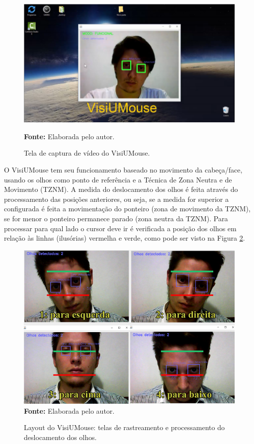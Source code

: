\begin{figure}[htbp]
\centering
\caption{Tela de captura de vídeo do VisiUMouse.}

\includegraphics[scale=.6]{img/visiumouse-1.png}

  \textbf{Fonte:} Elaborada pelo autor.
\label{fig:visiumouse-1}
\end{figure}

O VisiUMouse tem seu funcionamento baseado no movimento da cabeça/face, usando os olhos como ponto de referência e a Técnica de Zona Neutra e de Movimento (TZNM). A medida do deslocamento dos olhos é feita através do processamento das posições anteriores, ou seja, se a medida for superior a configurada é feita a movimentação do ponteiro (zona de movimento da TZNM), se for menor o ponteiro permanece parado (zona neutra da TZNM). Para processar para qual lado o cursor deve ir é verificada a posição dos olhos em relação às linhas (ilusórias) vermelha e verde, como pode ser visto na Figura \ref{fig:funcionamento}.
% 
% 

\begin{figure}[htbp]
\caption{Layout do VisiUMouse: telas de rastreamento e processamento do deslocamento dos olhos.}
\centering \includegraphics[scale=1]{img/funcionamento2.png}
\textbf{Fonte:} Elaborada pelo autor.
\label{fig:funcionamento}
\end{figure}

